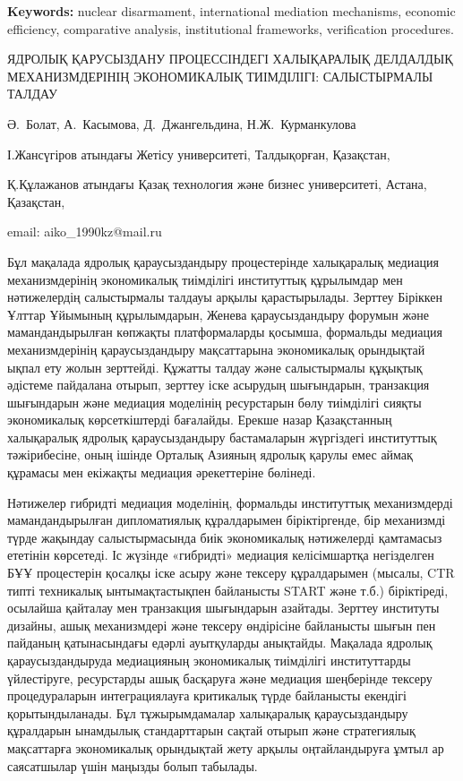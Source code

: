 {\bfseries Keywords:} nuclear disarmament, international mediation
mechanisms, economic efficiency, compa\-rative analysis, institutional
frameworks, verification procedures.

\begin{header}
ЯДРОЛЫҚ ҚАРУСЫЗДАНУ ПРОЦЕССІНДЕГІ ХАЛЫҚАРАЛЫҚ ДЕЛДАЛДЫҚ МЕХАНИЗМДЕРІНІҢ ЭКОНОМИКАЛЫҚ ТИІМДІЛІГІ: САЛЫСТЫРМАЛЫ ТАЛДАУ

Ә.~Болат,
А.~Касымова\envelope,
Д.~Джангельдина,
Н.Ж.~Курманкулова
\end{header}

\begin{affil}
І.Жансүгіров атындағы Жетісу университеті, Талдықорған, Қазақстан,

 Қ.Құлажанов атындағы Қазақ технология және бизнес университеті, Астана, Қазақстан,

email: aiko\_1990kz@mail.ru
\end{affil}

Бұл мақалада ядролық қараусыздандыру процестерінде халықаралық медиация
механизмдерінің экономикалық тиімділігі институттық құрылымдар мен
нәтижелердің салыстырмалы талдауы арқылы қарастырылады. Зерттеу Біріккен
Ұлттар Ұйымының құрылымдарын, Женева қараусыздандыру форумын және
мамандандырылған көпжақты платформаларды қосымша, формальды медиация
механизмдерінің қараусыздандыру мақсаттарына экономикалық орындықтай
ықпал ету жолын зерттейді. Құжатты талдау және салыстырмалы құқықтық
әдістеме пайдалана отырып, зерттеу іске асырудың шығындарын, транзакция
шығындарын және медиация моделінің ресурстарын бөлу тиімділігі сияқты
экономикалық көрсеткіштерді бағалайды. Ерекше назар Қазақстанның
халықаралық ядролық қараусыздандыру бастамаларын жүргіздегі институттық
тәжірибесіне, оның ішінде Орталық Азияның ядролық қарулы емес аймақ
құрамасы мен екіжақты медиация әрекеттеріне бөлінеді.

Нәтижелер гибридті медиация моделінің, формальды институттық
механизмдерді мамандандырылған дипломатиялық құралдарымен біріктіргенде,
бір механизмді түрде жақындау салыстырмасында биік экономикалық
нәтижелерді қамтамасыз ететінін көрсетеді. Іс жүзінде «гибридті»
медиация келісімшартқа негізделген БҰҰ процестерін қосалқы іске асыру
және тексеру құралдарымен (мысалы, CTR типті техникалық ынтымақтастықпен
байланысты START және т.б.) біріктіреді, осылайша қайталау мен
транзакция шығындарын азайтады. Зерттеу институты дизайны, ашық
механизмдері және тексеру өндірісіне байланысты шығын пен пайданың
қатынасындағы едәрлі ауытқуларды анықтайды. Мақалада ядролық
қараусыздандыруда медиацияның экономикалық тиімділігі институттарды
үйлестіруге, ресурстарды ашық басқаруға және медиация шеңберінде тексеру
процедураларын интеграциялауға критикалық түрде байланысты екендігі
қорытындыланады. Бұл тұжырымдамалар халықаралық қараусыздандыру
құралдарын ынамдылық стандарттарын сақтай отырып және стратегиялық
мақсаттарға экономикалық орындықтай жету арқылы оңтайландыруға ұмтыл ар
саясатшылар үшін маңызды болып табылады.

